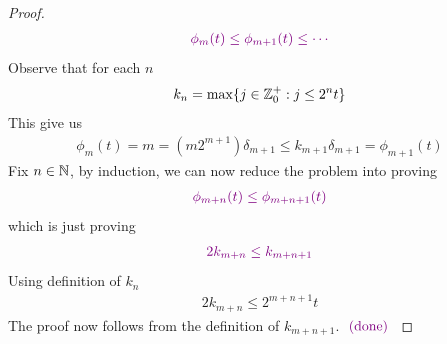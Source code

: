 \documentclass{report}
\begin{document}
\begin{proof}
\begin{align*}
\textcolor{violet}{\phi_m(t)\leq \phi_{m+1}(t)\leq \cdots }
\end{align*}
Observe that for each $n$
\begin{align*}
k_n= \max \{ j\in\mathbb{Z}_0^+: j\leq 2^nt  \}
\end{align*}
This give us 
\begin{align*}
\phi_m(t)=m= (m2^{m+1}) \delta_{m+1}\leq k_{m+1} \delta_{m+1}=\phi_{m+1}(t)
\end{align*}
Fix $n\in\mathbb{N}$, by induction, we can now reduce the problem into proving 
\begin{align*}
\textcolor{violet}{\phi_{m+n}(t)\leq \phi_{m+n+1}(t)}
\end{align*}
which is just proving 
\begin{align*}
\textcolor{violet}{2k_{m+n}\leq k_{m+n+1}}
\end{align*}
Using definition of $k_n$
\begin{align*}
2k_{m+n}\leq 2^{m+n+1}t 
\end{align*}
The proof now follows from the definition of $k_{m+n+1}$. $\textcolor{violet}{\text{ (done) }}$
\end{proof}
\end{document}

